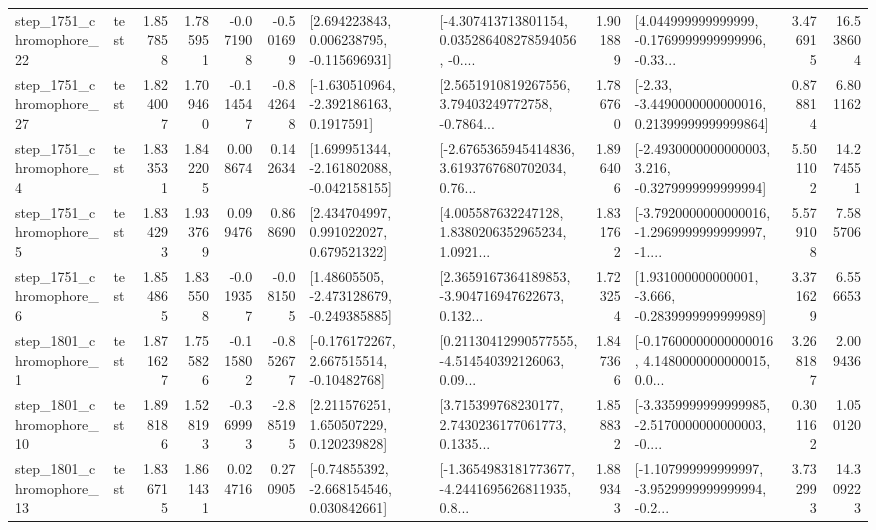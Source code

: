 \begin{tabular}{llrrrrllrlrr}
 step\_1751\_chromophore\_22 &      test &      1.857858 &    1.785951 &     -0.071908 & -0.501699 &    [2.694223843, 0.006238795, -0.115696931] &  [-4.307413713801154, 0.035286408278594056, -0.... &       1.901889 &  [4.044999999999999, -0.1769999999999996, -0.33... &            3.476915 &         16.538604 \\
 step\_1751\_chromophore\_27 &      test &      1.824007 &    1.709460 &     -0.114547 & -0.842648 &     [-1.630510964, -2.392186163, 0.1917591] &  [2.5651910819267556, 3.79403249772758, -0.7864... &       1.786760 &  [-2.33, -3.4490000000000016, 0.21399999999999864] &            0.878814 &          6.801162 \\
  step\_1751\_chromophore\_4 &      test &      1.833531 &    1.842205 &      0.008674 &  0.142634 &   [1.699951344, -2.161802088, -0.042158155] &  [-2.6765365945414836, 3.6193767680702034, 0.76... &       1.896406 &  [-2.4930000000000003, 3.216, -0.3279999999999994] &            5.501102 &         14.274551 \\
  step\_1751\_chromophore\_5 &      test &      1.834293 &    1.933769 &      0.099476 &  0.868690 &     [2.434704997, 0.991022027, 0.679521322] &  [4.005587632247128, 1.8380206352965234, 1.0921... &       1.831762 &  [-3.7920000000000016, -1.2969999999999997, -1.... &            5.579108 &          7.585706 \\
  step\_1751\_chromophore\_6 &      test &      1.854865 &    1.835508 &     -0.019357 & -0.081505 &    [1.48605505, -2.473128679, -0.249385885] &  [2.3659167364189853, -3.904716947622673, 0.132... &       1.723254 &   [1.931000000000001, -3.666, -0.2839999999999989] &            3.371629 &          6.556653 \\
  step\_1801\_chromophore\_1 &      test &      1.871627 &    1.755826 &     -0.115802 & -0.852677 &    [-0.176172267, 2.667515514, -0.10482768] &  [0.21130412990577555, -4.514540392126063, 0.09... &       1.847366 &  [-0.17600000000000016, 4.1480000000000015, 0.0... &            3.268187 &          2.009436 \\
 step\_1801\_chromophore\_10 &      test &      1.898186 &    1.528193 &     -0.369993 & -2.885195 &     [2.211576251, 1.650507229, 0.120239828] &  [3.715399768230177, 2.7430236177061773, 0.1335... &       1.858832 &  [-3.3359999999999985, -2.5170000000000003, -0.... &            0.301162 &          1.050120 \\
 step\_1801\_chromophore\_13 &      test &      1.836715 &    1.861431 &      0.024716 &  0.270905 &    [-0.74855392, -2.668154546, 0.030842661] &  [-1.3654983181773677, -4.2441695626811935, 0.8... &       1.889343 &  [-1.107999999999997, -3.9529999999999994, -0.2... &            3.732993 &         14.309223 \\

\end{tabular}
